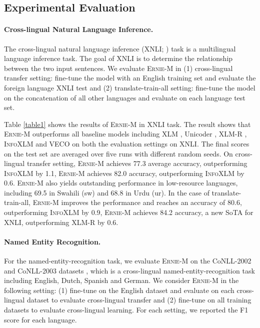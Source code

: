 \documentclass[11pt]{article}
\begin{document}
\subsection{Experimental Evaluation}
\paragraph{Cross-lingual Natural Language Inference.}
The cross-lingual natural language inference (XNLI; \citealt{conneau2018xnli}) task is a multilingual language inference task. The goal of XNLI is to determine the relationship between the two input sentences. We evaluate \textsc{Ernie-M} in (1) cross-lingual transfer \cite{conneau2018xnli} setting: fine-tune the model with an English training set and evaluate the foreign language XNLI test and (2) translate-train-all \cite{huang2019unicoder} setting: fine-tune the model on the concatenation of all other languages and evaluate on each language test set.

Table \ref{table1} shows the results of \textsc{Ernie-M} in XNLI task. The result shows that \textsc{Ernie-M} outperforms all baseline models including XLM \cite{lample2019cross}, Unicoder \cite{huang2019unicoder}, XLM-R \cite{conneau2019unsupervised}, \textsc{InfoXLM} \cite{chi2020infoxlm} and VECO \cite{luo2020veco} on both the evaluation settings on XNLI. The final scores on the test set are averaged over five runs with different random seeds. On cross-lingual transfer setting, \textsc{Ernie-M} achieves 77.3 average accuracy, outperforming \textsc{InfoXLM} by 1.1, \textsc{Ernie-M} achieves 82.0 accuracy, outperforming \textsc{InfoXLM} by 0.6. \textsc{Ernie-M} also yields outstanding performance in low-resource languages, including 69.5 in Swahili (sw) and 68.8 in Urdu (ur). In the case of translate-train-all, \textsc{Ernie-M} improves the performance and reaches an accuracy of 80.6, outperforming \textsc{InfoXLM} by 0.9, \textsc{Ernie-M} achieves 84.2 accuracy, a new SoTA for XNLI, outperforming XLM-R by 0.6. 


\paragraph{Named Entity Recognition.}
For the named-entity-recognition task, we evaluate \textsc{Ernie-M} on the CoNLL-2002 and CoNLL-2003 datasets \cite{sang2003introduction}, which is a cross-lingual named-entity-recognition task including English, Dutch, Spanish and German. We consider \textsc{Ernie-M} in the following setting: (1) fine-tune on the English dataset and evaluate on each cross-lingual dataset to evaluate cross-lingual transfer and (2) fine-tune on all training datasets to evaluate cross-lingual learning. For each setting, we reported the F1 score for each language.
\end{document}
